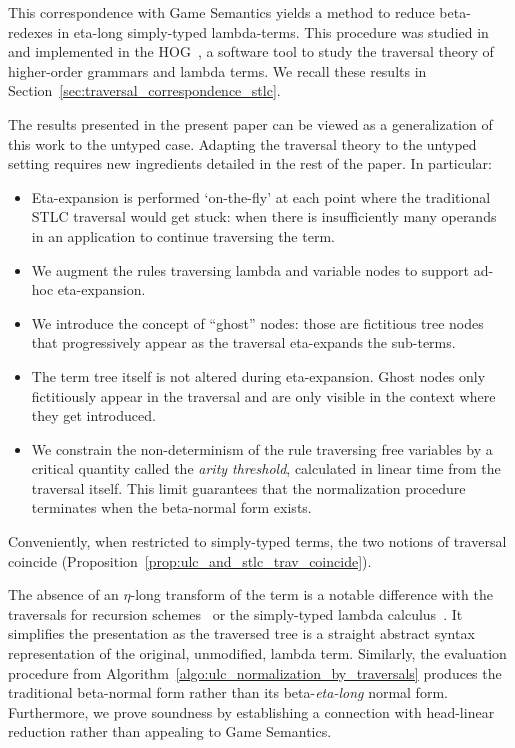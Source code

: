 \documentclass{elsarticle}
\theoremstyle{plain}
\theoremstyle{definition}
\theoremstyle{remark}
\begin{document}
 This correspondence with Game Semantics yields a method to reduce beta-redexes in eta-long simply-typed lambda-terms. This procedure was studied in~\cite{BlumPhd,BlumGalop2008,Blum-HogTool,Ong-NormByTrav2015} and implemented in the HOG~\cite{BlumGalop2008, BlumPhd}, a software tool to study the traversal theory of higher-order grammars and lambda terms. We recall these results in Section~\ref{sec:traversal_correspondence_stlc}.

 The results presented in the present paper can be viewed as a generalization of this work to the untyped case. Adapting the traversal theory to the untyped setting requires new ingredients detailed in the rest of the paper. In particular:
\begin{itemize}[nosep]
 \item Eta-expansion is performed `on-the-fly' at each point where the traditional STLC traversal would get stuck: when there is insufficiently many operands in an application to continue traversing the term.
 \item  We augment the rules traversing lambda and variable nodes to support ad-hoc eta-expansion.
 \item We introduce the concept of ``ghost'' nodes: those are fictitious tree nodes that progressively appear as the traversal eta-expands the sub-terms.
\item The term tree itself is not altered during eta-expansion. Ghost nodes only fictitiously appear in the traversal and are only visible in the context where they get introduced.
\item We constrain the non-determinism of the rule traversing free variables by a critical quantity called the \emph{arity threshold}, calculated in linear time from the traversal itself. This limit guarantees that the normalization procedure terminates when the beta-normal form exists.
\end{itemize}

Conveniently, when restricted to simply-typed terms, the two notions of traversal coincide (Proposition~\ref{prop:ulc_and_stlc_trav_coincide}).

The absence of an $\eta$-long transform of the term is a notable difference with the traversals for recursion schemes~\cite{Ong2006} or the simply-typed lambda calculus~\cite{BlumPhd}. It simplifies the presentation as the traversed tree is a straight abstract syntax representation of the original, unmodified, lambda term. Similarly, the evaluation procedure from Algorithm~\ref{algo:ulc_normalization_by_traversals} produces the traditional beta-normal form rather than its beta-\emph{eta-long} normal form. Furthermore, we prove soundness by establishing a connection with head-linear reduction rather than appealing to Game Semantics.
\end{document}
